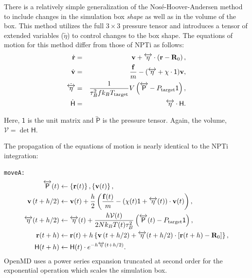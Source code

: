 \documentclass[letterpaper]{report}
\begin{document}
There is a relatively simple generalization of the
Nos\'e-Hoover-Andersen method to include changes in the simulation box
{\it shape} as well as in the volume of the box.  This method utilizes
the full $3 \times 3$ pressure tensor and introduces a tensor of
extended variables ($\overleftrightarrow{\eta}$) to control changes to
the box shape.  The equations of motion for this method differ from
those of NPTi as follows:
\begin{eqnarray}
\dot{{\bf r}} & = & {\bf v} + \overleftrightarrow{\eta} \cdot \left( {\bf r} - {\bf R}_0 \right), \\
\dot{{\bf v}} & = & \frac{{\bf f}}{m} - (\overleftrightarrow{\eta} +
\chi \cdot \mathsf{1}) {\bf v}, \\
\dot{\overleftrightarrow{\eta}} & = & \frac{1}{\tau_{B}^2 f k_B
T_{\mathrm{target}}} V \left( \overleftrightarrow{\mathsf{P}} - P_{\mathrm{target}}\mathsf{1} \right) ,\\
\dot{\mathsf{H}} & = &  \overleftrightarrow{\eta} \cdot \mathsf{H} .
\label{eq:melchionna2}
\end{eqnarray}

Here, $\mathsf{1}$ is the unit matrix and $\overleftrightarrow{\mathsf{P}}$
is the pressure tensor.  Again, the volume, $\mathcal{V} = \det
\mathsf{H}$. 

The propagation of the equations of motion is nearly identical to the
NPTi integration:

{\tt moveA:}
\begin{align*}
\overleftrightarrow{\mathsf{P}}(t) &\leftarrow \left\{{\bf r}(t)\right\}, 
	\left\{{\bf v}(t)\right\} ,\\
%
{\bf v}\left(t + h / 2\right)  &\leftarrow {\bf v}(t) 
	+ \frac{h}{2} \left( \frac{{\bf f}(t)}{m} - 
	\left(\chi(t)\mathsf{1} + \overleftrightarrow{\eta}(t) \right) \cdot
	{\bf v}(t) \right), \\ 
%
\overleftrightarrow{\eta}(t + h / 2) &\leftarrow 
	\overleftrightarrow{\eta}(t) + \frac{h \mathcal{V}(t)}{2 N k_B
	T(t) \tau_B^2} \left( \overleftrightarrow{\mathsf{P}}(t) 
	- P_{\mathrm{target}}\mathsf{1} \right), \\ 
%
{\bf r}(t + h) &\leftarrow {\bf r}(t) + h \left\{ {\bf v}
	\left(t + h / 2 \right) + \overleftrightarrow{\eta}(t +
	h / 2) \cdot \left[ {\bf r}(t + h) 
	- {\bf R}_0 \right] \right\}, \\
%
\mathsf{H}(t + h) &\leftarrow \mathsf{H}(t) \cdot e^{-h
	\overleftrightarrow{\eta}(t + h / 2)} .
\end{align*}
OpenMD uses a power series expansion truncated at second order
for the exponential operation which scales the simulation box.
\end{document}
